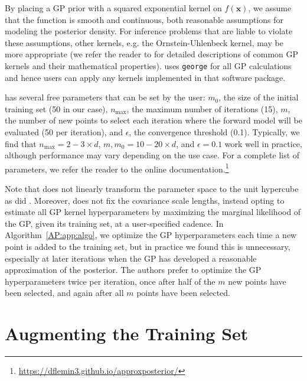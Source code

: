 By placing a GP prior with a squared exponential kernel on $f(\textbf{x})$, we assume that the function is smooth and continuous, both reasonable assumptions for modeling the posterior density. For inference problems that are liable to violate these assumptions, other kernels, e.g. the Ornstein-Uhlenbeck kernel, may be more appropriate (we refer the reader to \citet{Rasmussen2006} for detailed descriptions of common GP kernels and their mathematical properties). \approxposterior uses \texttt{george} \citep{george} for all GP calculations and hence users can apply any kernels implemented in that software package.

\approxposterior has several free parameters that can be set by the user: $m_0$, the size of the initial training set (50 in our case), $n_{\mathrm{max}}$, the maximum number of iterations (15), $m$, the number of new points to select each iteration where the forward model will be evaluated (50 per iteration), and $\epsilon$, the convergence threshold (0.1). Typically, we find that $n_{\mathrm{max}}=2-3 \times d$, $m, m_0 = 10-20 \times d$, and $\epsilon = 0.1$ work well in practice, although performance may vary depending on the use case. For a complete list of \approxposterior parameters, we refer the reader to the online documentation.\footnote{ \href{https://dflemin3.github.io/approxposterior}{https://dflemin3.github.io/approxposterior/}}

Note that \approxposterior does not linearly transform the parameter space to the unit hypercube as did \citet{Kandasamy2017}. Moreover, \approxposterior does not fix the covariance scale lengths, instead opting to estimate all GP kernel hyperparameters by maximizing the marginal likelihood of the GP, given its training set, at a user-specified cadence. In Algorithm~\ref{AP:app:algo}, we optimize the GP hyperparameters each time a new point is added to the training set, but in practice we found this is unnecessary, especially at later iterations when the GP has developed a reasonable approximation of the posterior. The authors prefer to optimize the GP hyperparameters twice per iteration, once after half of the $m$ new points have been selected, and again after all $m$ points have been selected.

\section{Augmenting the Training Set} \label{AP:sec:augment}

